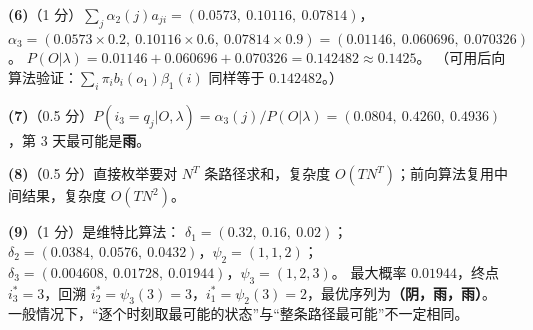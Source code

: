 \textbf{(6)}（1 分）$\sum_j\alpha_2(j)a_{ji}=(0.0573,\ 0.10116,\ 0.07814)$，\\
$\alpha_3=(0.0573\times0.2,\ 0.10116\times0.6,\ 0.07814\times0.9)=(0.01146,\ 0.060696,\ 0.070326)$。
$P(O|\lambda)=0.01146+0.060696+0.070326=0.142482\approx0.1425$。
（可用后向算法验证：$\sum_i\pi_ib_i(o_1)\beta_1(i)$ 同样等于 $0.142482$。）

\textbf{(7)}（0.5 分）$P(i_3=q_j|O,\lambda)=\alpha_3(j)/P(O|\lambda)=(0.0804,\ 0.4260,\ 0.4936)$，第 3 天最可能是\textbf{雨}。

\textbf{(8)}（0.5 分）直接枚举要对 $N^T$ 条路径求和，复杂度 $O(TN^T)$；前向算法复用中间结果，复杂度 $O(TN^2)$。

\textbf{(9)}（1 分）是维特比算法：
$\delta_1=(0.32,\ 0.16,\ 0.02)$；
$\delta_2=(0.0384,\ 0.0576,\ 0.0432)$，$\psi_2=(1,1,2)$；
$\delta_3=(0.004608,\ 0.01728,\ 0.01944)$，$\psi_3=(1,2,3)$。
最大概率 $0.01944$，终点 $i_3^*=3$，回溯 $i_2^*=\psi_3(3)=3$，$i_1^*=\psi_2(3)=2$，最优序列为\textbf{（阴，雨，雨）}。
一般情况下，“逐个时刻取最可能的状态”与“整条路径最可能”不一定相同。

